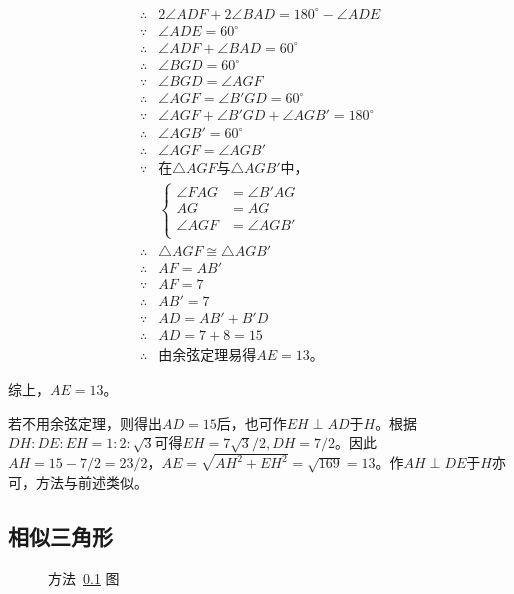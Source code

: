 \begin{align*}
  \therefore{}& 2\angle ADF + 2\angle BAD = 180^\circ - \angle ADE \\
  \because  {}& \angle ADE = 60^\circ \\
  \therefore{}& \angle ADF + \angle BAD = 60^\circ \\
  \therefore{}& \angle BGD = 60^\circ \\
  \because  {}& \angle BGD = \angle AGF \\
  \therefore{}& \angle AGF = \angle B'GD = 60^\circ \\
  \because  {}& \angle AGF + \angle B'GD + \angle AGB' = 180^\circ \\
  \therefore{}& \angle AGB' = 60^\circ \\
  \therefore{}& \angle AGF = \angle AGB' \\
  \because  {}& \text{在$\triangle AGF$与$\triangle AGB'$中，} \\
  &\left\{ \begin{aligned}
    \angle FAG &= \angle B'AG \\ AG &= AG \\ \angle AGF &= \angle AGB' \\
  \end{aligned} \right. \\
  \therefore{}& \triangle AGF \cong \triangle AGB' \\
  \therefore{}& AF = AB' \\
  \because  {}& AF = 7 \\
  \therefore{}& AB' = 7 \\
  \because  {}& AD = AB' + B'D \\
  \therefore{}& AD = 7 + 8 = 15 \\
  \therefore{}& \text{由余弦定理易得$AE = 13$。}
\end{align*}

综上，$AE = 13$。

若不用余弦定理，则得出$AD = 15$后，也可作$EH \perp AD$于$H$。根据$DH:DE:EH = 1:2:\sqrt3$可得$EH = 7\sqrt3/2, DH = 7/2$。因此$AH = 15 - 7/2 = 23/2$，$AE = \sqrt{AH^2 + EH^2} = \sqrt{169} = 13$。作$AH \perp DE$于$H$亦可，方法与前述类似。

\subsection{相似三角形} \label{subsec:000A-sim}

\begin{figure}
  \centering {}
  \caption{方法~\ref{subsec:000A-sim} 图} \label{fig:000A-sim}
\end{figure}

